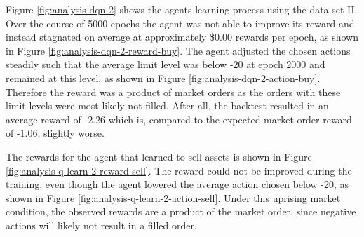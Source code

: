 Figure \ref{fig:analysis-dqn-2} shows the agents learning process using the data set II.
Over the course of 5000 epochs the agent was not able to improve its reward and instead stagnated on average at approximately \$0.00 rewards per epoch, as shown in Figure \ref{fig:analysis-dqn-2-reward-buy}.
The agent adjusted the chosen actions steadily such that the average limit level was below -20 at epoch 2000 and remained at this level, as shown in Figure \ref{fig:analysis-dqn-2-action-buy}.
Therefore the reward was a product of market orders as the orders with these limit levels were most likely not filled.
After all, the backtest resulted in an average reward of -2.26 which is, compared to the expected market order reward of -1.06, slightly worse.

The rewards for the agent that learned to sell assets is shown in Figure \ref{fig:analysis-q-learn-2-reward-sell}.
The reward could not be improved during the training, even though the agent lowered the average action chosen below -20, as shown in Figure \ref{fig:analysis-q-learn-2-action-sell}.
Under this uprising market condition, the observed rewards are a product of the market order, since negative actions will likely not result in a filled order.

